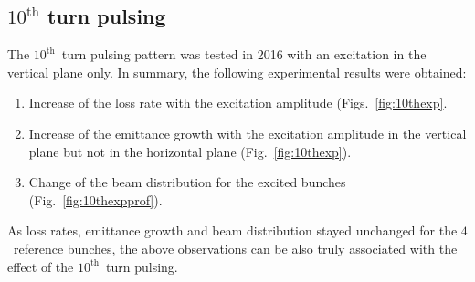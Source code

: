 \documentclass[%
 reprint,
 amsmath,amssymb,
 aps,
prstab,
]{revtex4-1}
\begin{document}
\subsection{$10^{\mathrm{th}}$ turn pulsing\label{sec:simex10}}
The $10^{\mathrm{th}}$~turn pulsing pattern was tested in 2016 with an excitation in the vertical plane only. In summary, the following experimental results were obtained:
\begin{enumerate}
	\item Increase of the loss rate with the excitation amplitude (Figs.~\ref{fig:10thexp}.
	\item Increase of the emittance growth with the excitation amplitude in the vertical plane but not in the horizontal plane (Fig.~\ref{fig:10thexp}).
	\item Change of the beam distribution for the excited bunches (Fig.~\ref{fig:10thexpprof}).	
\end{enumerate}
As loss rates, emittance growth and beam distribution stayed unchanged for the $4$~reference bunches, the above observations can be also truly associated with the effect of the $10^{\mathrm{th}}$~turn pulsing.
\end{document}
